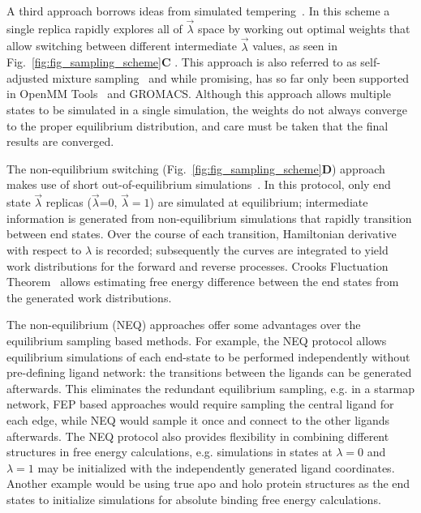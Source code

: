 \documentclass[9pt,bestpractices,pubversion]{livecoms}
\begin{document}
A third approach borrows ideas from simulated tempering~\cite{marinari1992simulated}. In this scheme a single replica rapidly explores all of $\vec{\lambda}$ space by working out optimal weights that allow switching between different intermediate $\vec{\lambda}$ values, as seen in Fig.~\ref{fig:fig_sampling_scheme}\textbf{C} . This approach is also referred to as self-adjusted mixture sampling~\cite{lyubartsev1992new, li2007simulated, tan2017optimally} and while promising, has so far only been supported in OpenMM Tools~\cite{andrearizzi2019choderalab} and GROMACS.  Although this approach allows multiple states to be simulated in a single simulation, the weights do not always converge to the proper equilibrium distribution, and care must be taken that the final results are converged. 

The non-equilibrium switching (Fig.~\ref{fig:fig_sampling_scheme}\textbf{D}) approach makes use of short out-of-equilibrium simulations~\cite{aldeghi2018accurate}. In this protocol, only end state $\vec{\lambda}$ replicas ($\vec{\lambda}$=0, $\vec{\lambda}=1$) are simulated at equilibrium; intermediate information is generated from non-equilibrium simulations that rapidly transition between end states. 
Over the course of each transition, Hamiltonian derivative with respect to $\lambda$ is recorded; subsequently the curves are integrated to yield work distributions for the forward and reverse processes. Crooks Fluctuation Theorem~\cite{crooks1999entropy} allows estimating free energy difference between the end states from the generated work distributions.~\cite{shirts2003equilibrium}

The non-equilibrium (NEQ) approaches offer some advantages over the equilibrium sampling based methods. For example, the NEQ protocol allows equilibrium simulations of each end-state to be performed independently without pre-defining ligand network: the transitions between the ligands can be generated afterwards. This eliminates the redundant equilibrium sampling, e.g. in a starmap network, FEP based approaches would require sampling the central ligand for each edge, while NEQ would sample it once and connect to the other ligands afterwards. The NEQ protocol also provides flexibility in combining different structures in free energy calculations, e.g. simulations in states at $\lambda=0$ and $\lambda=1$ may be initialized with the independently generated ligand coordinates. Another example would be using true apo and holo protein structures as the end states to initialize simulations for absolute binding free energy calculations. 
\end{document}
